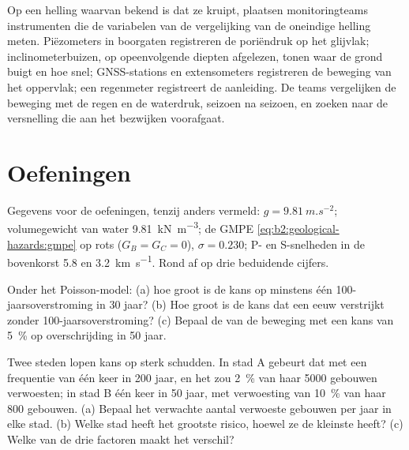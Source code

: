 \begin{inthefield}
Op een helling waarvan bekend is dat ze kruipt, plaatsen monitoringteams instrumenten die de variabelen van de
vergelijking van de oneindige helling meten. Piëzometers in boorgaten registreren de poriëndruk op het glijvlak;
inclinometerbuizen, op opeenvolgende diepten afgelezen, tonen waar de grond buigt en hoe snel;
GNSS-stations en extensometers registreren de beweging van het oppervlak; een regenmeter registreert de aanleiding.
De teams vergelijken de beweging met de regen en de waterdruk, seizoen na seizoen, en zoeken
naar de versnelling die aan het bezwijken voorafgaat.
\end{inthefield}

\section*{Oefeningen}\label{sec:b2:geological-hazards:exercises}

Gegevens voor de oefeningen, tenzij anders vermeld: $g = \qty{9.81}{m.s^{-2}}$; volumegewicht van water
\qty{9.81}{kN.m^{-3}}; de GMPE \eqref{eq:b2:geological-hazards:gmpe} op rots ($G_B = G_C = 0$),
$\sigma = 0.230$; P- en S-snelheden in de bovenkorst 5.8 en \qty{3.2}{km.s^{-1}}. Rond af op drie
beduidende cijfers.

\begin{exercise}[$\star$]\label{exo:b2:geological-hazards:1}
Onder het Poisson-model: (a) hoe groot is de kans op minstens één 100-jaarsoverstroming in 30 jaar?
(b) Hoe groot is de kans dat een eeuw verstrijkt zonder 100-jaarsoverstroming? (c) Bepaal de 
van de beweging met een kans van \qty{5}{\percent} op overschrijding in 50 jaar.
\end{exercise}

\begin{exercise}[$\star$]\label{exo:b2:geological-hazards:2}
Twee steden lopen kans op sterk schudden. In stad A gebeurt dat met een frequentie van één keer in 200 jaar, en het zou
\qty{2}{\percent} van haar 5000 gebouwen verwoesten; in stad B één keer in 50 jaar, met verwoesting van
\qty{10}{\percent} van haar 800 gebouwen. (a) Bepaal het verwachte aantal verwoeste gebouwen per
jaar in elke stad. (b) Welke stad heeft het grootste risico, hoewel ze de kleinste  heeft? (c)
Welke van de drie factoren maakt het verschil?
\end{exercise}

